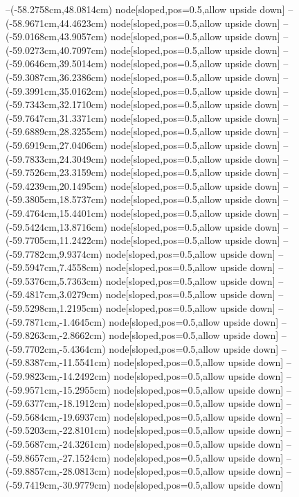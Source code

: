 --(-58.2758cm,48.0814cm) node[sloped,pos=0.5,allow upside down]{\arrowIn}
--(-58.9671cm,44.4623cm) node[sloped,pos=0.5,allow upside down]{\ArrowIn}
--(-59.0168cm,43.9057cm) node[sloped,pos=0.5,allow upside down]{\arrowIn}
--(-59.0273cm,40.7097cm) node[sloped,pos=0.5,allow upside down]{\ArrowIn}
--(-59.0646cm,39.5014cm) node[sloped,pos=0.5,allow upside down]{\ArrowIn}
--(-59.3087cm,36.2386cm) node[sloped,pos=0.5,allow upside down]{\ArrowIn}
--(-59.3991cm,35.0162cm) node[sloped,pos=0.5,allow upside down]{\ArrowIn}
--(-59.7343cm,32.1710cm) node[sloped,pos=0.5,allow upside down]{\ArrowIn}
--(-59.7647cm,31.3371cm) node[sloped,pos=0.5,allow upside down]{\arrowIn}
--(-59.6889cm,28.3255cm) node[sloped,pos=0.5,allow upside down]{\ArrowIn}
--(-59.6919cm,27.0406cm) node[sloped,pos=0.5,allow upside down]{\ArrowIn}
--(-59.7833cm,24.3049cm) node[sloped,pos=0.5,allow upside down]{\ArrowIn}
--(-59.7526cm,23.3159cm) node[sloped,pos=0.5,allow upside down]{\arrowIn}
--(-59.4239cm,20.1495cm) node[sloped,pos=0.5,allow upside down]{\ArrowIn}
--(-59.3805cm,18.5737cm) node[sloped,pos=0.5,allow upside down]{\ArrowIn}
--(-59.4764cm,15.4401cm) node[sloped,pos=0.5,allow upside down]{\ArrowIn}
--(-59.5424cm,13.8716cm) node[sloped,pos=0.5,allow upside down]{\ArrowIn}
--(-59.7705cm,11.2422cm) node[sloped,pos=0.5,allow upside down]{\ArrowIn}
--(-59.7782cm,9.9374cm) node[sloped,pos=0.5,allow upside down]{\ArrowIn}
--(-59.5947cm,7.4558cm) node[sloped,pos=0.5,allow upside down]{\ArrowIn}
--(-59.5376cm,5.7363cm) node[sloped,pos=0.5,allow upside down]{\ArrowIn}
--(-59.4817cm,3.0279cm) node[sloped,pos=0.5,allow upside down]{\ArrowIn}
--(-59.5298cm,1.2195cm) node[sloped,pos=0.5,allow upside down]{\ArrowIn}
--(-59.7871cm,-1.4645cm) node[sloped,pos=0.5,allow upside down]{\ArrowIn}
--(-59.8263cm,-2.8662cm) node[sloped,pos=0.5,allow upside down]{\ArrowIn}
--(-59.7702cm,-5.4364cm) node[sloped,pos=0.5,allow upside down]{\ArrowIn}
--(-59.8387cm,-11.5541cm) node[sloped,pos=0.5,allow upside down]{\ArrowIn}
--(-59.9823cm,-14.2492cm) node[sloped,pos=0.5,allow upside down]{\ArrowIn}
--(-59.9571cm,-15.2955cm) node[sloped,pos=0.5,allow upside down]{\ArrowIn}
--(-59.6377cm,-18.1912cm) node[sloped,pos=0.5,allow upside down]{\ArrowIn}
--(-59.5684cm,-19.6937cm) node[sloped,pos=0.5,allow upside down]{\ArrowIn}
--(-59.5203cm,-22.8101cm) node[sloped,pos=0.5,allow upside down]{\ArrowIn}
--(-59.5687cm,-24.3261cm) node[sloped,pos=0.5,allow upside down]{\ArrowIn}
--(-59.8657cm,-27.1524cm) node[sloped,pos=0.5,allow upside down]{\ArrowIn}
--(-59.8857cm,-28.0813cm) node[sloped,pos=0.5,allow upside down]{\arrowIn}
--(-59.7419cm,-30.9779cm) node[sloped,pos=0.5,allow upside down]{\ArrowIn}
